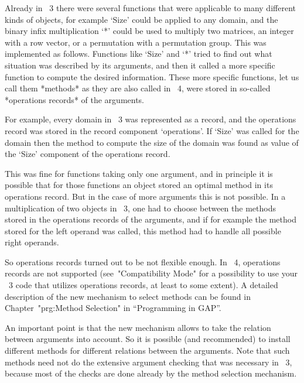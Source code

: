 
Already in {\GAP}~3 there were several functions that were applicable
to many different kinds of objects, for example `Size' could be
applied to any domain, and the binary infix multiplication `*' could
be used to multiply two matrices, an integer with a row vector, or a
permutation with a permutation group.  This was implemented as
follows.  Functions like `Size' and `*' tried to find out what
situation was described by its arguments, and then it called a more
specific function to compute the desired information.  These more
specific functions, let us call them *methods* as they are also called
in {\GAP}~4, were stored in so-called *operations records* of the
arguments.

For example, every domain in {\GAP}~3 was represented as a record, and
the operations record was stored in the record component `operations'.
If `Size' was called for the domain then the method to compute the
size of the domain was found as value of the `Size' component of the
operations record.

This was fine for functions taking only one argument, and in principle
it is possible that for those functions an object stored an optimal
method in its operations record.  But in the case of more arguments
this is not possible.  In a multiplication of two objects in {\GAP}~3,
one had to choose between the methods stored in the operations records
of the arguments, and if for example the method stored for the left
operand was called, this method had to handle all possible right
operands.

So operations records turned out to be not flexible enough.  In
{\GAP}~4, operations records are not supported (see~"Compatibility
Mode" for a possibility to use your {\GAP}~3 code that utilizes
operations records, at least to some extent).  A detailed description
of the new mechanism to select methods can be found in
Chapter~"prg:Method Selection" in ``Programming in GAP''.

An important point is that the new mechanism allows {\GAP} to take the
relation between arguments into account.  So it is possible (and
recommended) to install different methods for different relations
between the arguments.  Note that such methods need not do the
extensive argument checking that was necessary in {\GAP}~3, because
most of the checks are done already by the method selection mechanism.


